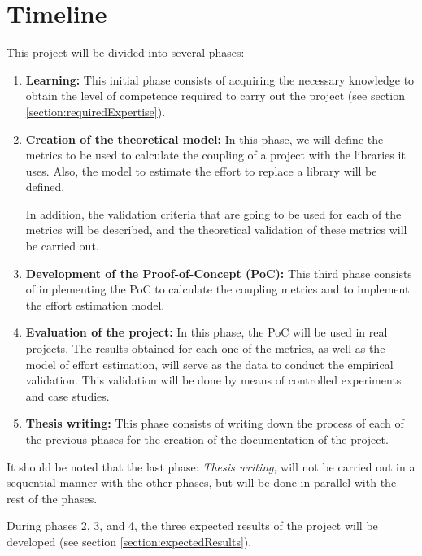 \section{Timeline}\label{section:timeline}
This project will be divided into several phases:

\begin{enumerate}
    \item \textbf{Learning:} This initial phase consists of acquiring the necessary knowledge to obtain the level of competence required to carry out the project
    (see section \ref{section:requiredExpertise}).

    \item \textbf{Creation of the theoretical model:} In this phase, we will define the metrics to be used to calculate the coupling of a project with the libraries it uses. Also, the model to estimate the effort to replace a library will be defined.

    In addition, the validation criteria that are going to be used for each of the metrics will be described, and the theoretical validation of these metrics will be carried out.

    \item \textbf{Development of the Proof-of-Concept (PoC):} This third phase consists of implementing the PoC to calculate the coupling metrics and to implement the effort estimation model.

    \item \textbf{Evaluation of the project:} In this phase, the PoC will be used in real projects. The results obtained for each one of the metrics, as well as the model of effort estimation, will serve as the data to conduct the empirical validation. This validation will be done by means of controlled experiments and case studies.

    \item \textbf{Thesis writing:} This phase consists of writing down the process of each of the previous phases for the creation of the documentation of the project.
\end{enumerate}

\noindent
It should be noted that the last phase: \textit{Thesis writing}, will not be carried out in a sequential manner with the other phases, but will be done in parallel with the rest of the phases.

During phases 2, 3, and 4, the three expected results of the project will be developed (see section \ref{section:expectedResults}).


